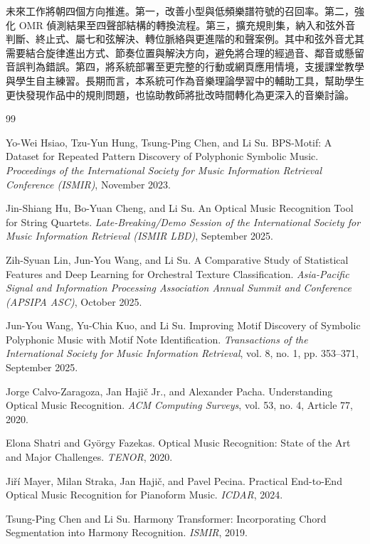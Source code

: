 \documentclass[12pt,a4paper]{article}
\begin{document}
未來工作將朝四個方向推進。第一，改善小型與低頻樂譜符號的召回率。第二，強化 OMR 偵測結果至四聲部結構的轉換流程。第三，擴充規則集，納入和弦外音判斷、終止式、屬七和弦解決、轉位脈絡與更進階的和聲案例。其中和弦外音尤其需要結合旋律進出方式、節奏位置與解決方向，避免將合理的經過音、鄰音或懸留音誤判為錯誤。第四，將系統部署至更完整的行動或網頁應用情境，支援課堂教學與學生自主練習。長期而言，本系統可作為音樂理論學習中的輔助工具，幫助學生更快發現作品中的規則問題，也協助教師將批改時間轉化為更深入的音樂討論。

\clearpage
{}
\begin{thebibliography}{99}

Yo-Wei Hsiao, Tzu-Yun Hung, Tsung-Ping Chen, and Li Su.
\newblock BPS-Motif: A Dataset for Repeated Pattern Discovery of Polyphonic Symbolic Music.
\newblock \textit{Proceedings of the International Society for Music Information Retrieval Conference (ISMIR)}, November 2023.

Jin-Shiang Hu, Bo-Yuan Cheng, and Li Su.
\newblock An Optical Music Recognition Tool for String Quartets.
\newblock \textit{Late-Breaking/Demo Session of the International Society for Music Information Retrieval (ISMIR LBD)}, September 2025.

Zih-Syuan Lin, Jun-You Wang, and Li Su.
\newblock A Comparative Study of Statistical Features and Deep Learning for Orchestral Texture Classification.
\newblock \textit{Asia-Pacific Signal and Information Processing Association Annual Summit and Conference (APSIPA ASC)}, October 2025.

Jun-You Wang, Yu-Chia Kuo, and Li Su.
\newblock Improving Motif Discovery of Symbolic Polyphonic Music with Motif Note Identification.
\newblock \textit{Transactions of the International Society for Music Information Retrieval}, vol. 8, no. 1, pp. 353--371, September 2025.

Jorge Calvo-Zaragoza, Jan Hajič Jr., and Alexander Pacha.
\newblock Understanding Optical Music Recognition.
\newblock \textit{ACM Computing Surveys}, vol. 53, no. 4, Article 77, 2020.

Elona Shatri and György Fazekas.
\newblock Optical Music Recognition: State of the Art and Major Challenges.
\newblock \textit{TENOR}, 2020.

Jiří Mayer, Milan Straka, Jan Hajič, and Pavel Pecina.
\newblock Practical End-to-End Optical Music Recognition for Pianoform Music.
\newblock \textit{ICDAR}, 2024.

Tsung-Ping Chen and Li Su.
\newblock Harmony Transformer: Incorporating Chord Segmentation into Harmony Recognition.
\newblock \textit{ISMIR}, 2019.

\end{thebibliography}
\end{document}
